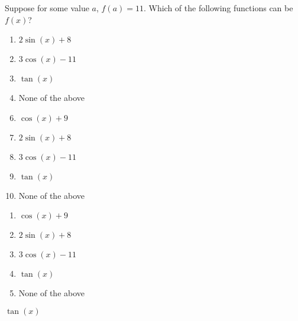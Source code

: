 

  Suppose for some value $a$, $f(a)=11$.  Which of the following functions can be $f(x)$?  



\ifsat
	\begin{enumerate}[label=\Alph*)]
		\item  $2\sin(x)+8$ 
		\item $3\cos(x)-11$
		\item  $\tan(x)$ %
		\item  None of the above
	\end{enumerate}
\else
\fi

\ifacteven
	\begin{enumerate}[label=\textbf{\Alph*.},itemsep=\fill,align=left]
		\setcounter{enumii}{5}
		\item    $\cos(x)+9$
		\item  $2\sin(x)+8$ 
		\item $3\cos(x)-11$
		\addtocounter{enumii}{1}
		\item  $\tan(x)$ %
		\item  None of the above
	\end{enumerate}
\else
\fi

\ifactodd
	\begin{enumerate}[label=\textbf{\Alph*.},itemsep=\fill,align=left]
		\item    $\cos(x)+9$
		\item  $2\sin(x)+8$ 
		\item $3\cos(x)-11$
		\item  $\tan(x)$ %
		\item  None of the above
	\end{enumerate}
\else
\fi

\ifgridin
  $\tan(x)$ %
		
\else
\fi


